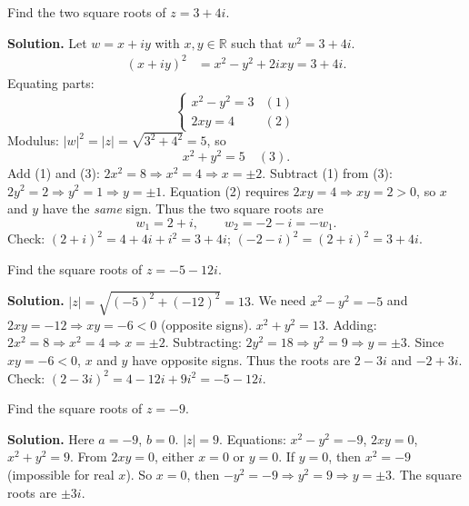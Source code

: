 \documentclass[11pt]{article}
\begin{document}
\begin{exoresolu}
Find the two square roots of $z = 3+4i$.

\textbf{Solution.}
Let $w = x+iy$ with $x,y \in \mathbb{R}$ such that $w^2 = 3+4i$.
\begin{align*}
(x+iy)^2 &= x^2 - y^2 + 2ixy = 3 + 4i.
\end{align*}
Equating parts:
\[\begin{cases}
x^2 - y^2 = 3 & (1)\\
2xy = 4       & (2)
\end{cases}\]
Modulus: $|w|^2 = |z| = \sqrt{3^2+4^2} = 5$, so
\[
x^2 + y^2 = 5 \quad (3).
\]
Add (1) and (3): $2x^2 = 8 \Rightarrow x^2 = 4 \Rightarrow x = \pm 2$.
Subtract (1) from (3): $2y^2 = 2 \Rightarrow y^2 = 1 \Rightarrow y = \pm 1$.
Equation (2) requires $2xy = 4 \Rightarrow xy = 2 > 0$, so $x$ and $y$ have the \emph{same} sign.
Thus the two square roots are
\[
w_1 = 2 + i,\qquad w_2 = -2 - i = -w_1.
\]
Check: $(2+i)^2 = 4 + 4i + i^2 = 3+4i$; $(-2-i)^2 = (2+i)^2 = 3+4i$.
\end{exoresolu}

\begin{exoresolu}
Find the square roots of $z = -5-12i$.

\textbf{Solution.}
$|z| = \sqrt{(-5)^2+(-12)^2} = 13$.
We need $x^2 - y^2 = -5$ and $2xy = -12 \Rightarrow xy = -6 < 0$ (opposite signs).
$x^2 + y^2 = 13$.
Adding: $2x^2 = 8 \Rightarrow x^2 = 4 \Rightarrow x = \pm 2$.
Subtracting: $2y^2 = 18 \Rightarrow y^2 = 9 \Rightarrow y = \pm 3$.
Since $xy = -6 < 0$, $x$ and $y$ have opposite signs.
Thus the roots are $2 - 3i$ and $-2 + 3i$.
Check: $(2-3i)^2 = 4 -12i +9i^2 = -5-12i$.
\end{exoresolu}

\begin{exoresolu}
Find the square roots of $z = -9$.

\textbf{Solution.}
Here $a = -9$, $b = 0$. $|z| = 9$.
Equations: $x^2 - y^2 = -9$, $2xy = 0$, $x^2 + y^2 = 9$.
From $2xy=0$, either $x=0$ or $y=0$.
If $y=0$, then $x^2 = -9$ (impossible for real $x$).
So $x=0$, then $-y^2 = -9 \Rightarrow y^2 = 9 \Rightarrow y = \pm 3$.
The square roots are $\pm 3i$.
\end{exoresolu}
\end{document}
